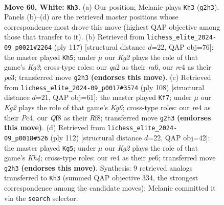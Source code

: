 \documentclass[11pt]{article}
\begin{document}
\clearpage

\begin{figure}[p]\centering
\begin{subfigure}{0.46\textwidth}\centering
\resizebox{\linewidth}{!}{%
\newchessgame
\chessboard[
  setfen={5Q2/8/5pk1/3p4/4r3/6P1/q5KP/8 w - - 0 60},
  showmover=false,
  pgfstyle=straightmove, color=movearrow, markmove={g2-h3}
]}
\caption{}
\end{subfigure}\hfill
\begin{subfigure}{0.46\textwidth}\centering
\resizebox{\linewidth}{!}{%
\newchessgame
\chessboard[
  setfen={8/8/R5k1/5pp1/4p3/4P3/5PK1/2r5 b - - 1 59},
  showmover=false,
  pgfstyle=straightmove, color=movearrow, markmove={g6-h5}
]}
\caption{}
\end{subfigure}
\\[4pt]
\begin{subfigure}{0.46\textwidth}\centering
\resizebox{\linewidth}{!}{%
\newchessgame
\chessboard[
  setfen={5R2/8/6KP/2p5/2P1k3/5p2/8/6q1 w - - 1 55},
  showmover=false,
  pgfstyle=straightmove, color=movearrow, markmove={g6-f7}
]}
\caption{}
\end{subfigure}\hfill
\begin{subfigure}{0.46\textwidth}\centering
\resizebox{\linewidth}{!}{%
\newchessgame
\chessboard[
  setfen={1Q6/5k2/4p3/4P2P/7K/6P1/8/7q w - - 6 57},
  showmover=false,
  pgfstyle=straightmove, color=movearrow, markmove={h4-g5}
]}
\caption{}
\end{subfigure}
\caption{\textbf{Move 60, White: \texttt{Kh3}.} (a) Our position; Melanie plays \texttt{Kh3} (\texttt{g2h3}). Panels (b)--(d) are the retrieved master positions whose correspondence most drove this move (highest QAP objective among those that transfer to it). (b) Retrieved from \texttt{lichess\_elite\_2024-09\_p0021\#2264} (ply 117) [structural distance $d$=22, QAP obj=76]: the master played \texttt{Kh5}; under $\mu$ our \emph{Kg2} plays the role of that game's \emph{Kg3}; cross-type roles: our \emph{q}a2 as their \emph{r}a6, our \emph{r}e4 as their \emph{p}e3; transferred move \texttt{g2h3} \textbf{(endorses this move)}. (c) Retrieved from \texttt{lichess\_elite\_2024-09\_p0017\#3574} (ply 108) [structural distance $d$=21, QAP obj=61]: the master played \texttt{Kf7}; under $\mu$ our \emph{Kg2} plays the role of that game's \emph{Kg6}; cross-type roles: our \emph{r}e4 as their \emph{P}c4, our \emph{Q}f8 as their \emph{R}f8; transferred move \texttt{g2h3} \textbf{(endorses this move)}. (d) Retrieved from \texttt{lichess\_elite\_2024-09\_p0018\#526} (ply 112) [structural distance $d$=22, QAP obj=42]: the master played \texttt{Kg5}; under $\mu$ our \emph{Kg2} plays the role of that game's \emph{Kh4}; cross-type roles: our \emph{r}e4 as their \emph{p}e6; transferred move \texttt{g2h3} \textbf{(endorses this move)}. Synthesis: 9 retrieved analogs transferred to \texttt{Kh3} (summed QAP objective 334, the strongest correspondence among the candidate moves); Melanie committed it via the \texttt{search} selector.}
\label{fig:thought-m118}
\end{figure}
\end{document}
